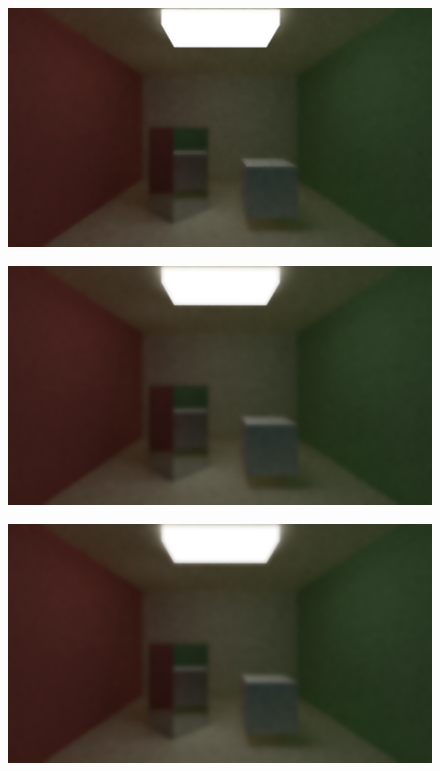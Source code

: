 \documentclass[titlepage,12pt]{report}
\begin{document}
\begin{appendices}
\begin{figure}[H]
	\centering
	\includegraphics[scale=0.5]{media/bilateral/cornell_normal_50_bilateral_filter_21_5_20.png}
	\label{ap30}
\end{figure}

\begin{figure}[H]
	\centering
	\includegraphics[scale=0.5]{media/bilateral/cornell_normal_50_bilateral_filter_21_5_40.png}
	\label{ap31}
\end{figure}

\begin{figure}[H]
	\centering
	\includegraphics[scale=0.5]{media/bilateral/cornell_normal_50_bilateral_filter_21_5_60.png}
	\label{ap32}
\end{figure}	


\end{appendices}
\end{document}
